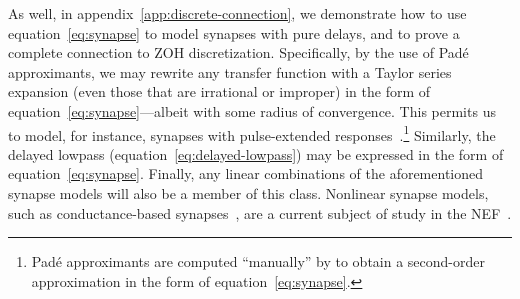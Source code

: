 \documentclass[12pt]{article}
\theoremstyle{definition}
\begin{document}
As well, in appendix~\ref{app:discrete-connection}, we demonstrate how to use equation~\ref{eq:synapse} to model synapses with pure delays, and to prove a complete connection to ZOH discretization.
Specifically, by the use of Pad\'e approximants, we may rewrite any transfer function with a Taylor series expansion (even those that are irrational or improper) in the form of equation~\ref{eq:synapse}---albeit with some radius of convergence.
This permits us to model, for instance, synapses with pulse-extended responses~\citep{voelker2017iscas}.\footnote{
Pad\'e approximants are computed ``manually'' by \citet[][equations~9--11]{voelker2017iscas} to obtain a second-order approximation in the form of equation~\ref{eq:synapse}.
}
Similarly, the delayed lowpass (equation~\ref{eq:delayed-lowpass}) may be expressed in the form of equation~\ref{eq:synapse}.
Finally, any linear combinations of the aforementioned synapse models will also be a member of this class.
Nonlinear synapse models, such as conductance-based synapses~\citep[e.g.,][equation~6]{destexhe1994efficient}, are a current subject of study in the NEF~\citep{stockel2017}.

\end{document}

